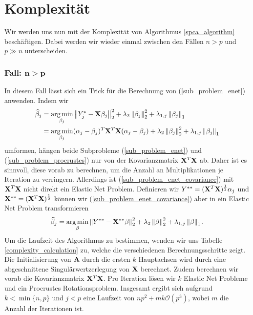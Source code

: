 

\section{Komplexität}
\label{complexity}

Wir werden uns nun mit der Komplexität von Algorithmus \ref{spca_algorithm} beschäftigen. Dabei werden wir wieder einmal zwischen den Fällen $n > p$ und $p \gg n$ unterscheiden.

\subsubsection{Fall: $\mathbf{n > p}$}

In diesem Fall lässt sich ein Trick für die Berechnung von (\ref{sub_problem_enet}) anwenden. Indem wir
\begin{align}
\label{sub_problem_enet_covariance}
\widehat{\beta}_j & = \operatorname*{arg\,min}_{\beta_j} \left\lVert Y_j^* - \mathbf{X} \beta_j \right\rVert_2^2 + \lambda_2 \left\lVert \beta_j \right\rVert_2^2 + \lambda_{1,j}\left\lVert \beta_j \right\rVert_1 \nonumber\\
& = \operatorname*{arg\,min}_{\beta_j} (\alpha_j - \beta_j)^T \mathbf{X}^T \mathbf{X} (\alpha_j - \beta_j) + \lambda_2 \left\lVert \beta_j \right\rVert_2^2 + \lambda_{1,j}\left\lVert \beta_j \right\rVert_1
\end{align}
umformen, hängen beide Subprobleme (\ref{sub_problem_enet}) und (\ref{sub_problem_procrustes}) nur von der Kovarianzmatrix $\mathbf{X}^T \mathbf{X}$ ab. Daher ist es sinnvoll, diese vorab zu berechnen, um die Anzahl an Multiplikationen je Iteration zu verringern. Allerdings ist (\ref{sub_problem_enet_covariance}) mit $\mathbf{X}^T \mathbf{X}$ nicht direkt ein Elastic Net Problem. Definieren wir $Y^{**} = (\mathbf{X}^T\mathbf{X})^{\frac{1}{2}} \alpha_j$ und $\mathbf{X}^{**} = (\mathbf{X}^T\mathbf{X})^{\frac{1}{2}}$ können wir (\ref{sub_problem_enet_covariance}) aber in ein Elastic Net Problem transformieren
$$\widehat{\beta}_j = \operatorname*{arg\,min}_{\beta} \left\lVert Y^{**} - \mathbf{X}^{**} \beta \right\rVert_2^2 + \lambda_2 \left\lVert \beta \right\rVert_2^2 + \lambda_{1,j}\left\lVert \beta \right\rVert_1.$$
Um die Laufzeit des Algorithmus zu bestimmen, wenden wir uns Tabelle \ref{complexity_calculation} zu, welche die verschiedenen Berechnungsschritte zeigt. Die Initialisierung von $\mathbf{A}$ durch die ersten $k$ Hauptachsen wird durch eine abgeschnittene Singulärwertzerlegung von $\mathbf{X}$ berechnet. Zudem berechnen wir vorab die Kovarianzmatrix $\mathbf{X}^T \mathbf{X}$. Pro Iteration lösen wir $k$ Elastic Net Probleme und ein Procrustes Rotationsproblem. Insgesamt ergibt sich aufgrund $k < \min \{n,p\}$ und $j < p$ eine Laufzeit von $np^2 + mk\mathcal{O}(p^3)$, wobei $m$ die Anzahl der Iterationen ist.

